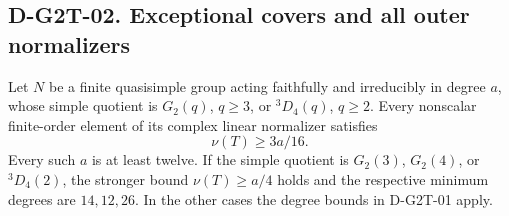 \subsection*{D-G2T-02. Exceptional covers and all outer normalizers}

\begin{lemma}
\label{D-G2T-02}
Let $N$ be a finite quasisimple group acting faithfully and
irreducibly in degree $a$, whose simple quotient is $G_2(q)$,
$q\ge3$, or ${}^3D_4(q)$, $q\ge2$.
Every nonscalar finite-order element of its complex linear
normalizer satisfies
\[
                         \nu(T)\ge3a/16.                  \tag{G2T.6}
\]
Every such $a$ is at least twelve.  If the simple quotient is
$G_2(3)$, $G_2(4)$, or ${}^3D_4(2)$, the stronger bound
$\nu(T)\ge a/4$ holds and the respective minimum degrees are
$14,12,26$.  In the other cases the degree bounds in
D-G2T-01 apply.
\end{lemma}

